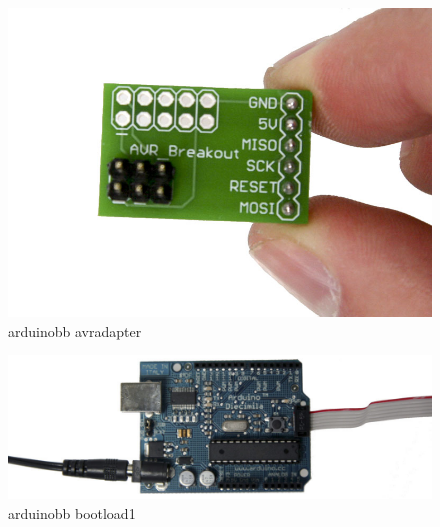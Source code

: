 \begin{figure}[!htb]
 \centering
 \includegraphics[scale=0.3]{img/arduino_breadboard/arduinobb_avradapter.jpg}
 \caption{arduinobb avradapter}
 \label{arduinobb avradapter}
\end{figure}


\begin{figure}[!htb]
 \centering
 \includegraphics[scale=0.3]{img/arduino_breadboard/arduinobb_bootload1.jpg}
 \caption{arduinobb bootload1}
 \label{arduinobb bootload1}
\end{figure}


